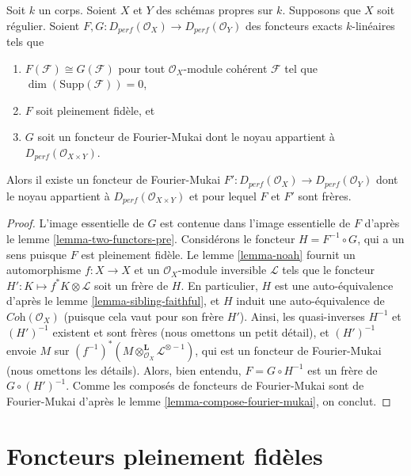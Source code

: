 \begin{lemma}
\label{lemma-two-functors}
Soit $k$ un corps. Soient $X$ et $Y$ des schémas propres sur $k$.
Supposons que $X$ soit régulier.
Soient $F, G : D_{perf}(\mathcal{O}_X) \to D_{perf}(\mathcal{O}_Y)$
des foncteurs exacts $k$-linéaires tels que
\begin{enumerate}
\item $F(\mathcal{F}) \cong G(\mathcal{F})$ pour tout
$\mathcal{O}_X$-module cohérent $\mathcal{F}$ tel que $\dim(\text{Supp}(\mathcal{F})) = 0$,
\item $F$ soit pleinement fidèle, et
\item $G$ soit un foncteur de Fourier-Mukai dont le noyau appartient à
$D_{perf}(\mathcal{O}_{X \times Y})$.
\end{enumerate}
Alors il existe un foncteur de Fourier-Mukai
$F' : D_{perf}(\mathcal{O}_X) \to D_{perf}(\mathcal{O}_Y)$
dont le noyau appartient à $D_{perf}(\mathcal{O}_{X \times Y})$
et pour lequel $F$ et $F'$ sont frères.
\end{lemma}

\begin{proof}
L'image essentielle de $G$ est contenue dans l'image essentielle
de $F$ d'après le lemme \ref{lemma-two-functors-pre}.
Considérons le foncteur $H = F^{-1} \circ G$,
qui a un sens puisque $F$ est pleinement fidèle.
Le lemme \ref{lemma-noah} fournit un automorphisme $f : X \to X$
et un $\mathcal{O}_X$-module inversible $\mathcal{L}$ tels que
le foncteur $H' : K \mapsto f^*K \otimes \mathcal{L}$
soit un frère de $H$. En particulier,
$H$ est une auto-équivalence d'après le lemme \ref{lemma-sibling-faithful},
et $H$ induit une auto-équivalence de
$\textit{Coh}(\mathcal{O}_X)$ (puisque cela vaut pour son frère $H'$).
Ainsi, les quasi-inverses $H^{-1}$ et $(H')^{-1}$ existent et sont frères
(nous omettons un petit détail), et $(H')^{-1}$ envoie $M$ sur
$(f^{-1})^*(M \otimes_{\mathcal{O}_X}^\mathbf{L} \mathcal{L}^{\otimes -1})$,
qui est un foncteur de Fourier-Mukai (nous omettons les détails).
Alors, bien entendu, $F = G \circ H^{-1}$ est un frère de
$G \circ (H')^{-1}$. Comme les composés de foncteurs de Fourier-Mukai
sont de Fourier-Mukai d'après le
lemme \ref{lemma-compose-fourier-mukai},
on conclut.
\end{proof}





\section{Foncteurs pleinement fidèles}
\label{section-fully-faithful}

